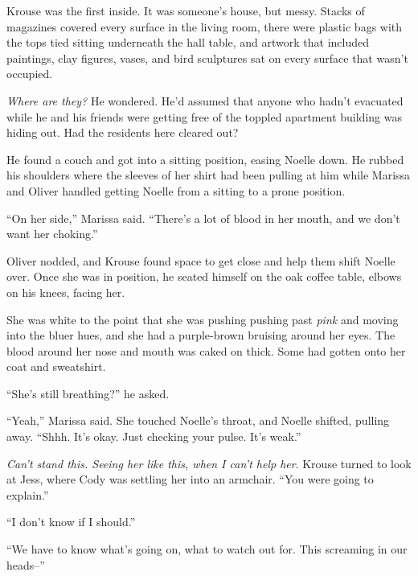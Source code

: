 Krouse was the first inside.  It was someone's house, but messy.  Stacks of magazines covered every surface in the living room, there were plastic bags with the tops tied sitting underneath the hall table, and artwork that included paintings, clay figures, vases, and bird sculptures sat on every surface that wasn't occupied.



\emph{Where are they?  }He wondered.  He'd assumed that anyone who hadn't evacuated while he and his friends were getting free of the toppled apartment building was hiding out.  Had the residents here cleared out?



He found a couch and got into a sitting position, easing Noelle down.  He rubbed his shoulders where the sleeves of her shirt had been pulling at him while Marissa and Oliver handled getting Noelle from a sitting to a prone position.



``On her side,'' Marissa said.  ``There's a lot of blood in her mouth, and we don't want her choking.''



Oliver nodded, and Krouse found space to get close and help them shift Noelle over.  Once she was in position, he seated himself on the oak coffee table, elbows on his knees, facing her.



She was white to the point that she was pushing pushing past \emph{pink} and moving into the bluer hues, and she had a purple-brown bruising around her eyes.  The blood around her nose and mouth was caked on thick.  Some had gotten onto her coat and sweatshirt.



``She's still breathing?'' he asked.



``Yeah,'' Marissa said.  She touched Noelle's throat, and Noelle shifted, pulling away.  ``Shhh.  It's okay.  Just checking your pulse.  It's weak.''



\emph{Can't stand this.  Seeing her like this, when I can't help her}.  Krouse turned to look at Jess, where Cody was settling her into an armchair.  ``You were going to explain.''



``I don't know if I should.''



``We have to know what's going on, what to watch out for.  This screaming in our heads--''



